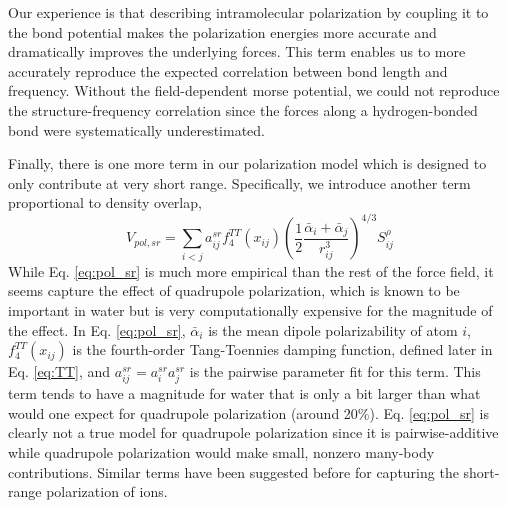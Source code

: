 \documentclass[journal=jacsat,manuscript=article]{achemso}
\begin{document}
Our experience is that describing intramolecular polarization by coupling it to the bond potential makes the polarization energies more accurate and dramatically improves the underlying forces. This term enables us to more accurately reproduce the expected correlation between bond length and frequency. Without the field-dependent morse potential, we could not reproduce the structure-frequency correlation since the forces along a hydrogen-bonded  bond were systematically underestimated.

Finally, there is one more term in our polarization model which is designed to only contribute at very short range. Specifically, we introduce another term proportional to density overlap,
\begin{equation}
  V_{pol,sr}=\sum_{i<j}a_{ij}^{sr}f_4^{TT}(x_{ij})\left(\frac{1}{2}\frac{\bar{\alpha}_i + \bar{\alpha}_j}{r_{ij}^3}\right)^{4/3}S_{ij}^{\rho}
\label{eq:pol_sr}
\end{equation}
\noindent
While Eq. \ref{eq:pol_sr} is much more empirical than the rest of the force field, it seems capture the effect of quadrupole polarization, which is known to be important in water\cite{herman2023accurate} but is very computationally expensive for the magnitude of the effect. In Eq. \ref{eq:pol_sr}, $\bar{\alpha}_i$ is the mean dipole polarizability of atom $i$, $f_4^{TT}(x_{ij})$ is the fourth-order Tang-Toennies damping function, defined later in Eq. \ref{eq:TT}, and $a_{ij}^{sr}=a_{i}^{sr}a_{j}^{sr}$ is the pairwise parameter fit for this term. This term tends to have a magnitude for water that is only a bit larger than what would one expect for quadrupole polarization (around 20\%). Eq. \ref{eq:pol_sr} is clearly not a true model for quadrupole polarization since it is pairwise-additive while quadrupole polarization would make small, nonzero many-body contributions. Similar terms have been suggested before for capturing the short-range polarization of ions.\cite{sheng2022semiempirical}
\end{document}

